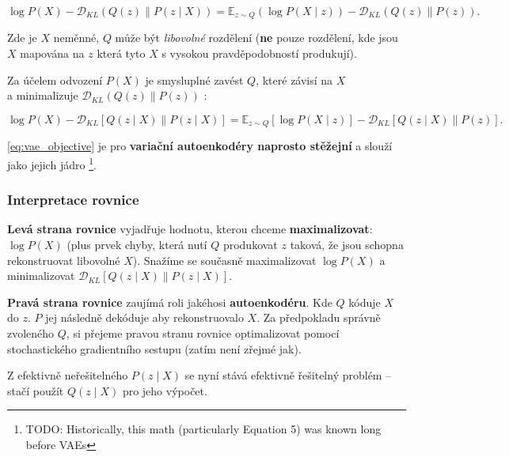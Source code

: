 \begin{equation}
    \log P(X) - \mathcal{D}_{KL}(Q(z)\parallel P(z\mid X)) = \mathds{E}_{z \sim Q}(\log P(X\mid z)) - \mathcal{D}_{KL}(Q(z)\parallel P(z)).
\end{equation}

Zde je $X$ neměnné, $Q$ může být \emph{libovolné} rozdělení (\textbf{ne} pouze rozdělení, kde jsou $X$ mapována na $z$ která tyto $X$ s vysokou pravděpodobností produkují).

Za účelem odvození $P(X)$ je smysluplné zavést $Q$, které závisí na $X$\\
a minimalizuje $\mathcal{D}_{KL}(Q(z)\parallel P(z))$ \cite{Doersch2021}:

\begin{equation} \label{eq:vae_objective}
    \log P(X) - \mathcal{D}_{KL}\left[ Q(z \mid X)\parallel P(z\mid X) \right] = \mathds{E}_{z \sim Q}\left[ \log P(X\mid z)\right] - \mathcal{D}_{KL}\left[ Q(z\mid X)\parallel P(z) \right]. 
\end{equation}

\autoref{eq:vae_objective} je pro \textbf{variační autoenkodéry naprosto stěžejní} a slouží jako jejich jádro \footnote{TODO: Historically, this math (particularly Equation 5) was known long before VAEs}. \cite{Doersch2021}


\subsubsection{Interpretace rovnice}
\textbf{Levá strana rovnice} vyjadřuje hodnotu, kterou chceme \textbf{maximalizovat}: $\log P(X)$ (plus prvek chyby, která nutí $Q$ produkovat $z$ taková, že jsou schopna rekonstruovat libovolné $X$).
Snažíme se současně maximalizovat $\log P(X)$ a minimalizovat $\mathcal{D}_{KL}\left[ Q(z \mid X)\parallel P(z\mid X) \right]$. \cite{Doersch2021}

\textbf{Pravá strana rovnice} zaujímá roli jakéhosi \textbf{autoenkodéru}. Kde $Q$ kóduje $X$ do $z$. $P$ jej následně dekóduje aby rekonstruovalo $X$.
Za předpokladu správně zvoleného $Q$, si přejeme pravou stranu rovnice optimalizovat pomocí stochastického gradientního sestupu (zatím není zřejmé jak). \cite{Doersch2021}  

Z efektivně neřešitelného $P(z\mid X)$ se nyní stává efektivně řešitelný problém – stačí použít $Q(z\mid X)$ pro jeho výpočet. \cite{Doersch2021}